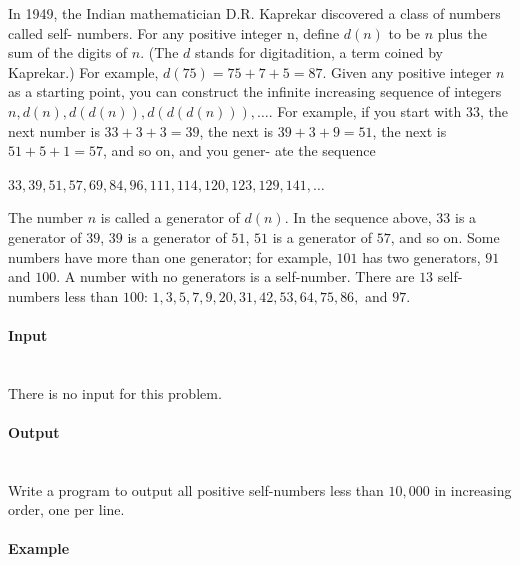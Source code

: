 \documentclass{article}
\begin{document}
In 1949, the Indian mathematician D.R. Kaprekar discovered a class of numbers called self-
numbers. For any positive integer n, define $d(n)$ to be $n$ plus the sum of the digits of $n$. (The $d$
stands for digitadition, a term coined by Kaprekar.) For example, $d(75) = 75 + 7 + 5 = 87$. Given
any positive integer $n$ as a starting point, you can construct the infinite increasing sequence of
integers $n, d(n), d(d(n)), d(d(d(n))), …$. For example, if you start with $33$, the next number is
$33 + 3 + 3 = 39$, the next is $39 + 3 + 9 = 51$, the next is $51 + 5 + 1 = 57$, and so on, and you gener-
ate the sequence
\begin{center}
$33, 39, 51, 57, 69, 84, 96, 111, 114, 120, 123, 129, 141, …$
\end{center}
The number $n$ is called a generator of $d(n)$. In the sequence above, $33$ is a generator of $39$, $39$ is
a generator of $51$, $51$ is a generator of $57$, and so on. Some numbers have more than one generator;
for example, $101$ has two generators, $91$ and $100$. A number with no generators is a self-number.
There are $13$ self-numbers less than $100$: $1, 3, 5, 7, 9, 20, 31, 42, 53, 64, 75, 86,$ and $97$.

\paragraph{Input} \mbox{} \\

There is no input for this problem.

\paragraph{Output}\mbox{} \\

Write a program to output all positive self-numbers less than $10,000$ in increasing order, one per line.

\paragraph{Example}\mbox{} \\
\end{document}
